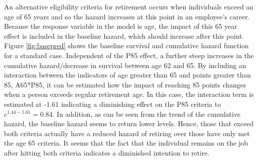An alternative eligibility criteria for retirement occurs when individuals exceed an age of 65 years and so the hazard increases at this point in an employee's career.  Because the response variable in the model is age, the impact of this 65 year effect is included in the baseline hazard, which should increase after this point.  Figure \ref{fig:basepred} shows the baseline survival and cumulative hazard function for a standard case. Independent of the P85 effect, a further steep increases in the cumulative hazard/decrease in survival between age 62 and 65. By including an interaction between the indicators of age greater than 65 and points greater than 85, A65*P85, it can be estimated how the impact of reaching 85 points changes when a person exceeds regular retirement age.  In this case, the interaction term is estimated at -1.61 indicating a diminishing effect on the P85 criteria to $e^{1.44-1.61} =0.84$.  In addition, as can be seen from the trend of the cumulative hazard, the baseline hazard seems to return lower levels.  Hence, those that exceed both criteria actually have a reduced hazard of retiring over those have only met the age 65 criteria.  It seems that the fact that the individual remains on the job after hitting both criteria indicates a diminished intention to retire.

